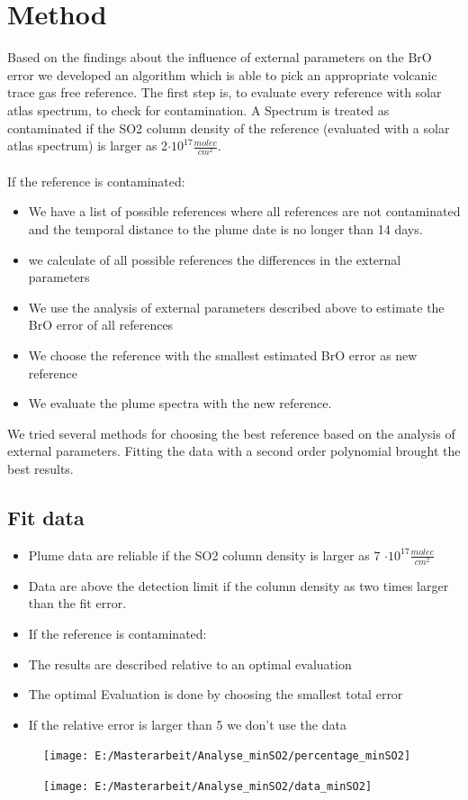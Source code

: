 \documentclass  [
  paper    = a4,
  BCOR     = 10mm,
  twoside,
  fontsize = 12pt,
  fleqn,
  toc      = bibnumbered,
  toc      = listofnumbered,
  numbers  = noendperiod,
  headings = normal,
  listof   = leveldown,
  version  = 3.03
]                                       {scrreprt}
\begin{document}
	\chapter{Method}
	Based on the findings about the influence of external parameters on the BrO error we developed an algorithm which is able to pick an appropriate volcanic trace gas free reference. 
	The first step is, to evaluate every reference with solar atlas spectrum, to check for contamination.	A Spectrum is treated as contaminated if the SO2 column density of the reference (evaluated with a solar atlas spectrum) is larger as 2$\cdot 10^{17}\frac{molec}{cm^2}$.\\
	\\
	If the reference is contaminated:
	\begin{itemize}
		\item We have a list of possible references where all references are not contaminated and the temporal distance to the plume date is no longer than 14 days.
		\item we calculate of all possible references the differences in the external parameters
		\item We use the analysis of external parameters described above to estimate the BrO error of all references
		\item We choose the reference with the smallest estimated BrO error as new reference
		\item We evaluate the plume spectra with the new reference.
	\end{itemize}

	We tried several methods for choosing the best reference based on the analysis of external parameters. Fitting the data with a second order polynomial brought the best results.
	\section{Fit data}
	\begin{itemize}
	
		\item Plume data are reliable if the SO2 column density is larger as 7 $\cdot 10^{17} \frac{molec}{cm^2}$
		\item Data are above the detection limit if the column density as two times larger than the fit error.
		\item If the reference is contaminated:

		\item The results are described relative to an optimal evaluation
		\item The optimal Evaluation is done by choosing the smallest total error
		\item If the relative error is larger than 5 we don't use the data
	\end{itemize}
\begin{figure}
	\centering
	\texttt{[image: E:/Masterarbeit/Analyse\_minSO2/percentage\_minSO2]}
	\caption{}
	\label{fig:percentageminso2}
\end{figure}
\begin{figure}
	\centering
	\texttt{[image: E:/Masterarbeit/Analyse\_minSO2/data\_minSO2]}
	\caption{}
	\label{fig:dataminso2}
\end{figure}
\end{document}
